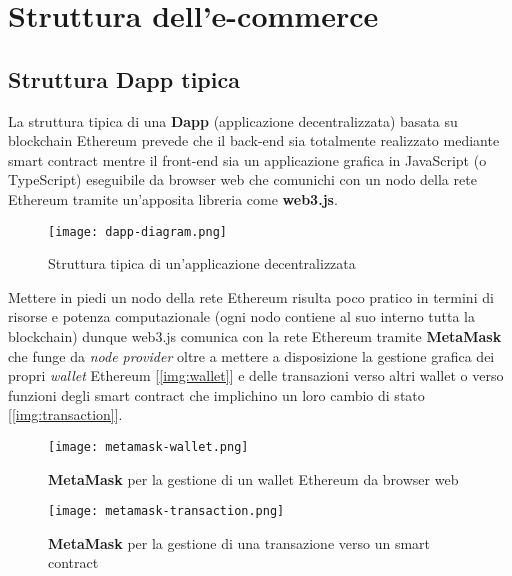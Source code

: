 \newpage

\section{Struttura dell'e-commerce}
    \subsection{Struttura Dapp tipica}
    La struttura tipica di una \textbf{Dapp} (applicazione decentralizzata) basata su blockchain Ethereum prevede che il back-end sia totalmente realizzato mediante smart contract mentre il front-end sia un applicazione grafica in JavaScript (o TypeScript) eseguibile da browser web che comunichi con un nodo della rete Ethereum tramite un'apposita libreria come \textbf{web3.js}.

    \begin{figure}[h!]
        \centering
        \texttt{[image: dapp-diagram.png]}
        \caption{Struttura tipica di un'applicazione decentralizzata}
    \end{figure}

    Mettere in piedi un nodo della rete Ethereum risulta poco pratico in termini di risorse e potenza computazionale (ogni nodo contiene al suo interno tutta la blockchain) dunque web3.js comunica con la rete Ethereum tramite \textbf{MetaMask} che funge da \textit{node provider} oltre a mettere a disposizione la gestione grafica dei propri \textit{wallet} Ethereum [\autoref{img:wallet}] e delle transazioni verso altri wallet o verso funzioni degli smart contract che implichino un loro cambio di stato [\autoref{img:transaction}].

    \begin{figure}[p]
        \centering
        \texttt{[image: metamask-wallet.png]}
        \caption{\textbf{MetaMask} per la gestione di un wallet Ethereum da browser web}
        \label{img:wallet}

        \centering
        \hspace*{-1cm}
        \texttt{[image: metamask-transaction.png]}
        \caption{\textbf{MetaMask} per la gestione di una transazione verso un smart contract}
        \label{img:transaction}
    \end{figure}

